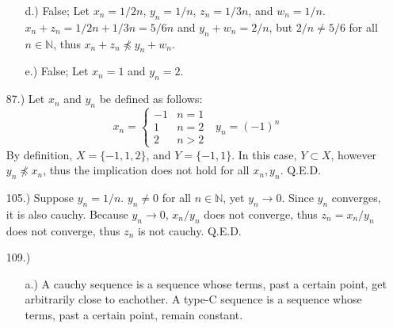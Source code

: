 \documentclass[12pt]{article}
\begin{document}
\begin{itemize}
\begin{itemize}
        \item [d.)] False; Let $x_n=1/2n$, $y_n=1/n$, $z_n=1/3n$, and $w_n=1/n$. $x_n+z_n=1/2n+1/3n=5/6n$ and $y_n+w_n=2/n$, but $2/n\ne5/6$ for all $n\in\mathbb{N}$, thus $x_n+z_n\npreceq y_n+w_n$.

        \item [e.)] False; Let $x_n=1$ and $y_n=2$.
    \end{itemize}

    \item [87.)] Let $x_n$ and $y_n$ be defined as follows:
    \[x_n=\begin{cases}
        -1 & n=1\\
        1 & n=2\\
        2 & n>2
    \end{cases}\ \ \ y_n=(-1)^n\]
    By definition, $X=\{-1,1,2\}$, and $Y=\{-1,1\}$. In this case, $Y\subset X$, however $y_n\npreceq x_n$, thus the implication does not hold for all $x_n,y_n$. Q.E.D.






    
    \item [105.)] Suppose $y_n=1/n$. $y_n\ne0$ for all $n\in\mathbb{N}$, yet $y_n\to0$. Since $y_n$ converges, it is also cauchy. Because $y_n\to0$, $x_n/y_n$ does not converge, thus $z_n=x_n/y_n$ does not converge, thus $z_n$ is not cauchy. Q.E.D.




    \item [109.)] \begin{itemize}
        \item [a.)] A cauchy sequence is a sequence whose terms, past a certain point, get arbitrarily close to eachother. A type-C sequence is a sequence whose terms, past a certain point, remain constant.


\end{itemize}
\end{itemize}
\end{document}
